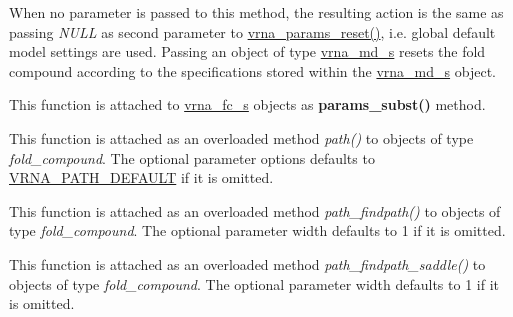 \begin{DoxyRefList}
When no parameter is passed to this method, the resulting action is the same as passing {\itshape N\+U\+LL} as second parameter to \mbox{\hyperlink{group__energy__parameters_gac40dc82e48a72a97cfc58b9da08a7792}{vrna\+\_\+params\+\_\+reset()}}, i.\+e. global default model settings are used. Passing an object of type \mbox{\hyperlink{group__model__details_structvrna__md__s}{vrna\+\_\+md\+\_\+s}} resets the fold compound according to the specifications stored within the \mbox{\hyperlink{group__model__details_structvrna__md__s}{vrna\+\_\+md\+\_\+s}} object.  
\item[\label{wrappers__wrappers000079}%
\Hypertarget{wrappers__wrappers000079}%
Global \mbox{\hyperlink{group__energy__parameters_ga5d1909208f7ea3baa98b75afaa1f62ca}{vrna\+\_\+params\+\_\+subst}} (vrna\+\_\+fold\+\_\+compound\+\_\+t $\ast$vc, vrna\+\_\+param\+\_\+t $\ast$par)]This function is attached to \mbox{\hyperlink{group__fold__compound_structvrna__fc__s}{vrna\+\_\+fc\+\_\+s}} objects as {\bfseries params\+\_\+subst()} method.  
\item[\label{wrappers__wrappers000093}%
\Hypertarget{wrappers__wrappers000093}%
Global \mbox{\hyperlink{group__paths_gab6aee4143f8b103518d5cbfe6bfe5eae}{vrna\+\_\+path}} (vrna\+\_\+fold\+\_\+compound\+\_\+t $\ast$vc, short $\ast$pt, unsigned int steps, unsigned int options)]This function is attached as an overloaded method {\itshape path()} to objects of type {\itshape fold\+\_\+compound}. The optional parameter {\ttfamily options} defaults to \mbox{\hyperlink{group__paths_gaf1bb1f8fec8d24e3b821f621b19f77b4}{V\+R\+N\+A\+\_\+\+P\+A\+T\+H\+\_\+\+D\+E\+F\+A\+U\+LT}} if it is omitted.  
\item[\label{wrappers__wrappers000065}%
\Hypertarget{wrappers__wrappers000065}%
Global \mbox{\hyperlink{group__direct__paths_ga4b2283c4142cafd99678495585fcc842}{vrna\+\_\+path\+\_\+findpath}} (vrna\+\_\+fold\+\_\+compound\+\_\+t $\ast$vc, const char $\ast$s1, const char $\ast$s2, int width)]This function is attached as an overloaded method {\itshape path\+\_\+findpath()} to objects of type {\itshape fold\+\_\+compound}. The optional parameter {\ttfamily width} defaults to 1 if it is omitted.  
\item[\label{wrappers__wrappers000063}%
\Hypertarget{wrappers__wrappers000063}%
Global \mbox{\hyperlink{group__direct__paths_gad611574a76593e26021f177e7854b6b4}{vrna\+\_\+path\+\_\+findpath\+\_\+saddle}} (vrna\+\_\+fold\+\_\+compound\+\_\+t $\ast$vc, const char $\ast$s1, const char $\ast$s2, int width)]This function is attached as an overloaded method {\itshape path\+\_\+findpath\+\_\+saddle()} to objects of type {\itshape fold\+\_\+compound}. The optional parameter {\ttfamily width} defaults to 1 if it is omitted.  

\end{DoxyRefList}
